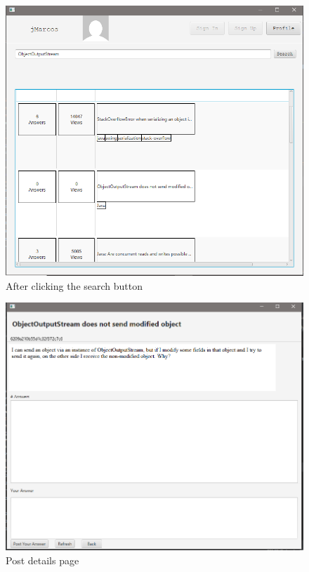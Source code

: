 \documentclass[11pt]{report}
\begin{document}
\begin{figure}[H]
  \centering
  \includegraphics[width=\textwidth,keepaspectratio=true]{img/user_manual/RicercaPost2.png}
  \caption{After clicking the search button}
  \label{fig:RicercaPost2}
\end{figure}
\begin{figure}[H]
  \centering
  \includegraphics[width=\textwidth,keepaspectratio=true]{img/user_manual/RicercaPost3.png}
  \caption{Post details page}
  \label{fig:RicercaPost3}
\end{figure}
\end{document}

